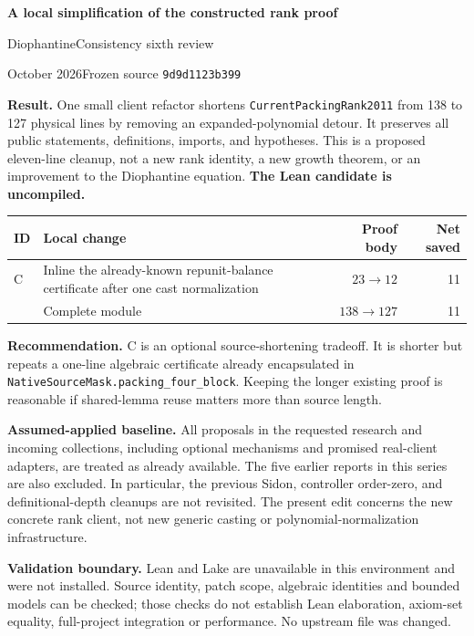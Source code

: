 

\begin{center}
{\LARGE\bfseries A local simplification of the constructed rank proof}\par\medskip
{\large DiophantineConsistency sixth review}\par{} October 2026\quad Frozen source \texttt{9d9d1123b399}
\end{center}

\textbf{Result.} One small client refactor shortens \texttt{CurrentPackingRank2011} from 138 to 127 physical lines by removing an expanded-polynomial detour. It preserves all public statements, definitions, imports, and hypotheses. This is a proposed eleven-line cleanup, not a new rank identity, a new growth theorem, or an improvement to the Diophantine equation. \textbf{The Lean candidate is uncompiled.}

\begin{tabularx}{\linewidth}{@{}lXrr@{}}\toprule
ID & Local change & Proof body & Net saved\\\midrule
C & Inline the already-known repunit-balance certificate after one cast normalization & $23\to12$ & 11\\
\midrule
 & Complete module & $138\to127$ & 11\\\bottomrule
\end{tabularx}

\textbf{Recommendation.} C is an optional source-shortening tradeoff. It is shorter but repeats a one-line algebraic certificate already encapsulated in \texttt{NativeSourceMask.packing\_four\_block}. Keeping the longer existing proof is reasonable if shared-lemma reuse matters more than source length.

\textbf{Assumed-applied baseline.} All proposals in the requested research and incoming collections, including optional mechanisms and promised real-client adapters, are treated as already available. The five earlier reports in this series are also excluded. In particular, the previous Sidon, controller order-zero, and definitional-depth cleanups are not revisited. The present edit concerns the new concrete rank client, not new generic casting or polynomial-normalization infrastructure.

\textbf{Validation boundary.} Lean and Lake are unavailable in this environment and were not installed. Source identity, patch scope, algebraic identities and bounded models can be checked; those checks do not establish Lean elaboration, axiom-set equality, full-project integration or performance. No upstream file was changed.


